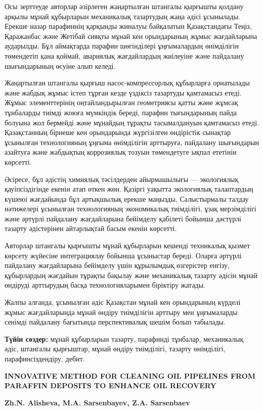 Осы зерттеуде авторлар әзірлеген жаңартылған штангалы қырғышты қолдану
арқылы мұнай құбырларын механикалық тазартудың жаңа әдісі ұсынылады.
Ерекше назар парафиннің қарқынды жиналуы байқалатын Қазақстандағы Теңіз,
Қаражанбас және Жетібай сияқты мұнай кен орындарының жұмыс жағдайларына
аударылды. Бұл аймақтарда парафин шөгінділері ұңғымалардың өнімділігін
төмендетіп қана қоймай, авариялық жағдайлардың жиілеуіне және пайдалану
шығындарының өсуіне алып келеді.

Жаңартылған штангалы қырғыш насос-компрессорлық құбырларға орнатылады
және жабдық жұмыс істеп тұрған кезде үздіксіз тазартуды қамтамасыз
етеді. Жұмыс элементтерінің оңтайландырылған геометриясы қатты және
жұмсақ тұнбаларды тиімді жоюға мүмкіндік береді, парафин тығындарының
пайда болуына жол бермейді және мұнайдың тұрақты тасымалдануын
қамтамасыз етеді. Қазақстанның бірнеше кен орындарында жүргізілген
өндірістік сынақтар ұсынылған технологияның ұңғыма өнімділігін
арттыруға, пайдалану шығындарын азайтуға және жабдықтың коррозиялық
тозуын төмендетуге ықпал ететінін көрсетті.

Әсіресе, бұл әдістің химиялық тәсілдерден айырмашылығы --- экологиялық
қауіпсіздігінде екенін атап өткен жөн. Қазіргі уақытта экологиялық
талаптардың күшеюі жағдайында бұл артықшылық ерекше маңызды.
Салыстырмалы талдау нәтижелері ұсынылған технологияның экономикалық
тиімділігі, ұзақ мерзімділігі және әртүрлі пайдалану жағдайларына
бейімделу қабілеті бойынша дәстүрлі тазарту әдістерінен айтарлықтай
басым екенін көрсетті.

Авторлар штангалы қырғышты мұнай құбырларын кешенді техникалық қызмет
көрсету жүйесіне интеграциялау бойынша ұсыныстар береді. Оларға әртүрлі
пайдалану жағдайларына бейімделу үшін құрылымдық өзгерістер енгізу,
құбырлардың жағдайын тұрақты бақылау және механикалық тазарту әдісін
мұнай өндіруді арттырудың басқа технологияларымен біріктіру жатады.

Жалпы алғанда, ұсынылған әдіс Қазақстан мұнай кен орындарының күрделі
жұмыс жағдайларында мұнай өндіру тиімділігін арттыру мен ұңғымаларды
сенімді пайдалану бағытында перспективалық шешім болып табылады.

{\bfseries Түйін сөздер:} мұнай құбырларын тазарту, парафинді тұнбалар,
механикалық әдіс, штангалы қырғыштар, мұнай өндіру тиімділігі, тазарту
өнімділігі, парафинсіздендіру, дебит.

\begin{header}
{\bfseries INNOVATIVE METHOD FOR CLEANING OIL PIPELINES FROM PARAFFIN DEPOSITS TO ENHANCE OIL RECOVERY}

{\bfseries
{}Zh.N. Alisheva\envelope,
M.A. Sarsenbayev,
Z.A. Sarsenbaev
}
\end{header}

